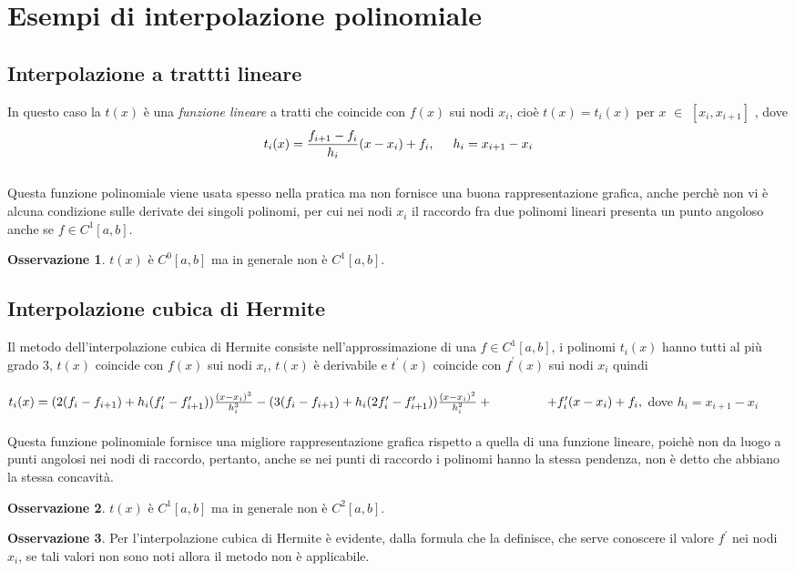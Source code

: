 \documentclass[a4paper,12pt]{report}
\newcommand\tab[1][0.5cm]{\hspace*{#1}}
\theoremstyle{definition}
\newtheorem{oss}{Osservazione}[chapter]
\begin{document}
\section{Esempi di interpolazione polinomiale}
\subsection{Interpolazione a trattti lineare}
In questo caso la $t(x)$ è una \textit{funzione lineare} a tratti che coincide con $f(x)$ sui nodi $x_i$, cioè $t(x) = t_i(x)$ per $x$ $\in$ $[x_i,x_{i+1}]$ , dove
$$t_i(x) = \frac{f_{i+1} - f_i}{h_i} (x - x_i) + f_i, \tab h_i = x_{i+1} - x_i$$\\
Questa funzione polinomiale viene usata spesso nella pratica ma non fornisce una buona rappresentazione grafica, anche perchè non vi è alcuna condizione sulle derivate dei singoli polinomi, per cui nei nodi $x_i$ il raccordo fra due polinomi lineari presenta un punto angoloso anche se $f \in C^1 [a,b]$.
\begin{oss}
	$t(x)$ è $C^0[a,b]$ ma in generale non è $C^1[a,b]$.
\end{oss}
\subsection{Interpolazione cubica di Hermite}
Il metodo dell'interpolazione cubica di Hermite consiste nell'approssimazione di una $f \in C^1[a,b]$, i polinomi $t_i(x)$ hanno tutti al più grado 3, $t(x)$ coincide con $f(x)$ sui nodi $x_i$,
$t(x)$ è derivabile e $t^\prime(x)$ coincide con $f^\prime(x)$ sui nodi $x_i$ quindi \\\\
$t_i(x) = (2(f_i - f_{i+1}) + h_i(f_i^\prime-f_{i+1}^\prime))\frac{(x-x_i)^3}{h_i^3} - (3(f_i - f_{i+1}) + h_i(2f_i^\prime-f_{i+1}^\prime))\frac{(x-x_i)^2}{h_i^2}
+ \tab \tab \tab +f_i^\prime(x-x_i) + f_i,$ \tab \tab \tab \tab \tab \tab \tab \tab \tab dove $h_i = x_{i+1} - x_i$ \\\\
Questa funzione polinomiale fornisce una migliore rappresentazione grafica rispetto a quella di una funzione lineare, poichè non da luogo a punti angolosi nei nodi di raccordo, pertanto, anche se nei punti di raccordo i polinomi hanno la stessa pendenza, non è detto che abbiano la stessa concavità.
\begin{oss}
	$t(x)$ è $C^1[a,b]$ ma in generale non è $C^2[a,b]$.
\end{oss}
\begin{oss}
	Per l'interpolazione cubica di Hermite è evidente, dalla formula che la definisce, che serve conoscere il valore $f^\prime$ nei nodi $x_i$, se tali valori non sono noti allora il metodo non è applicabile.
\end{oss}
\end{document}
